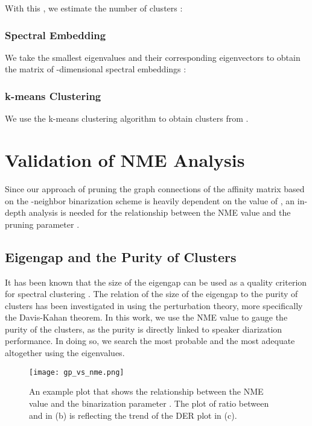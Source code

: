 \documentclass[journal]{IEEEtran}
\begin{document}
        With this , we estimate the number of clusters :
        
        
    \subsubsection{Spectral Embedding} We take the smallest  eigenvalues and their corresponding eigenvectors to obtain the matrix of -dimensional spectral embeddings :
    
     
    \subsubsection{k-means Clustering} We use the k-means clustering algorithm \cite{lloyd1982least} to obtain  clusters from .
\vspace{-0ex}
\section{Validation of NME Analysis}
Since our approach of pruning the graph connections of the affinity matrix based on the -neighbor binarization scheme is heavily dependent on the value of , an in-depth analysis is needed for the relationship between the NME value  and the pruning parameter .
\vspace{-2ex}
\subsection{Eigengap and the Purity of Clusters}
 It has been known that the size of the eigengap can be used as a quality criterion for spectral clustering \cite{von2007tutorial}. The relation of the size of the eigengap to the purity of clusters has been investigated in \cite{von2007tutorial, stewart1990matrix} using the perturbation theory, more specifically the Davis-Kahan theorem. In this work, we use the NME value  to gauge the purity of the clusters, as the purity is directly linked to speaker diarization performance. In doing so, we search the most probable  and the most adequate  altogether using the eigenvalues.
\vspace{-1.0ex}
\begin{figure}[t]
\label{fig:gp_vs_nme}
\vspace{-0.0ex}
\centerline{\texttt{[image: gp\_vs\_nme.png]}}
\vspace{-1.5ex}
\caption{An example plot that shows the relationship between the NME value  and the binarization parameter . The plot of ratio between  and  in (b) is reflecting the trend of the DER plot in (c).}
\end{figure}
\end{document}
